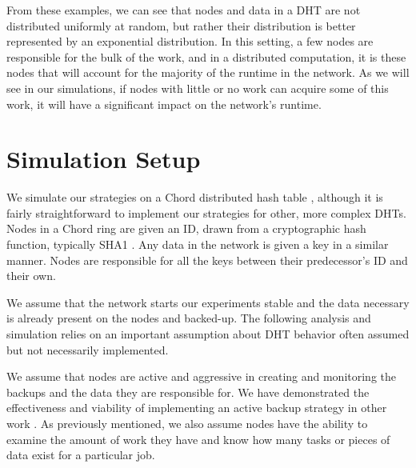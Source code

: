 \documentclass[11pt,conference]{IEEEtran}
\begin{document}
From these examples, we can see that nodes and data in a DHT are not distributed uniformly at random, but rather their distribution is better represented by  an exponential distribution.
In this setting, a few nodes are responsible for the bulk of the work, and in a distributed computation, it is these nodes that will account for the majority of the runtime in the network.
As we will see in our simulations, if nodes with little or no work can acquire some of this work, it will have a significant impact on the network's runtime.



\section{Simulation Setup}
\label{sec:auto-simulation}



We simulate our strategies on a Chord distributed hash table \cite{chord}, although it is fairly straightforward to implement our strategies for other, more complex DHTs.
Nodes in a Chord ring are given an ID, drawn from a cryptographic hash function, typically SHA1 \cite{sha1}.
Any data in the network is given a key in a similar manner.
Nodes are responsible for all the keys between their predecessor's ID and their own.

We assume that the network starts our experiments stable and the data necessary is already present on the nodes and backed-up.
The following analysis and simulation relies on an important assumption about DHT behavior often assumed but not necessarily implemented.


We assume that nodes are active and aggressive in creating and monitoring the backups and the data they are responsible for.
We have demonstrated the effectiveness and viability of implementing an active backup strategy in other work \cite{chordreduce} \cite{urdht}.
As previously mentioned, we also assume nodes have the ability to examine the amount of work they have and know how many tasks or pieces of data exist for a particular job.
\end{document}
